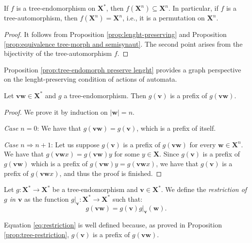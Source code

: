 \documentclass[mat1]{fmfdeloTS2.0}
\newcommand{\obs}{}				%
\newcommand{\word}{\mathbf}				%
\newcommand{\abece}{\mathbf{X}}			%
\newcommand{\fslovar}{\mathbf{X^*}}		%
\begin{document}
\begin{proposition}\label{prop:tree-endomorph preserve lenght}
If $f$ is a tree-endomorphism on $\fslovar$, then $f(\abece^n)\subseteq \abece^n$. In particular, if $f$ is a tree-automorphism, then $f(\abece^n)=\abece^n$, i.e., it is a permutation on $\abece^n$.
\end{proposition}
\begin{proof}
It follows from Proposition \autoref{prop:lenght-preserving} and Proposition \autoref{prop:equivalence tree-morph and semisynaut}. The second point arises from the bijectivity of the tree-automorphism $f$.
\end{proof}

Proposition \autoref{prop:tree-endomorph preserve lenght} provides a graph perspective on the lenght-preserving condition of actions of automata.

\begin{proposition}\label{prop:tree-restriction}
Let $\word{vw}\in\fslovar$ and $g$ a tree-endomorphism. Then $g(\word{v})$ is a prefix of $g(\word{vw})$. 
\end{proposition}
\begin{proof}
We prove it by induction on $|\word{w}|=n$.

\emph{Case $n=0$}: We have that $g(\word{vw})=g(\word{v})$, which is a prefix of itself.

\emph{Case $n\Rightarrow n+1$}: Let us suppose $g(\word{v})$ is a prefix of $g(\word{vw})$ for every $\word{w}\in\abece^n$. We have that $g(\word{vw}x)=g(\word{vw})y$ for some $y\in\abece$. Since $g(\word{v})$ is a prefix of $g(\word{vw})$ which is a prefix of $g(\word{vw})y=g(\word{vw}x)$, we have that $g(\word{v})$ is a prefix of $g(\word{vw}x)$, and thus the proof is finished.
\end{proof}

\begin{definition}
Let $g:\fslovar\longrightarrow\fslovar$ be a \obs{tree-endomorphism} and $\word{v}\in\fslovar$. We define the \emph{restriction of $g$ in $\word{v}$} as the function $g|_{\word{v}}:\fslovar\longrightarrow\fslovar$ such that:
\label{def:tree-restriction}
\begin{equation}\label{eq:restriction}
g(\word{vw})=g(\word{v})g|_{\word{v}}(\word{w}).
\end{equation}
\end{definition}

\begin{remark}
Equation \eqref{eq:restriction} is well defined because, as proved in Proposition \autoref{prop:tree-restriction}, $g(\word{v})$ is a prefix of $g(\word{vw})$.
\end{remark}
\end{document}
